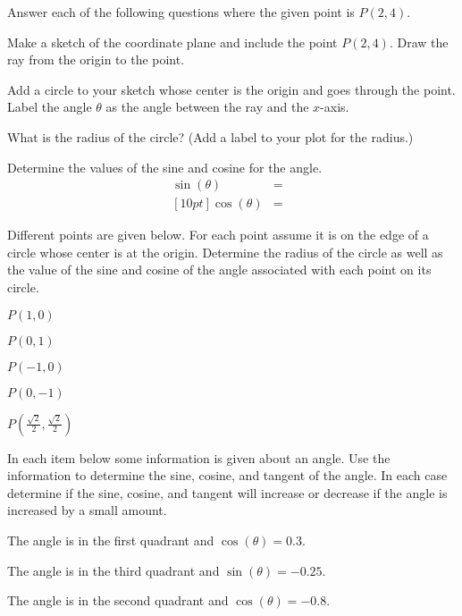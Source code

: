 \begin{problem}
\item Answer each of the following questions where the given point is $P(2,4)$.
  \begin{subproblem}
  \item Make a sketch of the coordinate plane and include the point
    $P(2,4)$. Draw the ray from the origin to the point.
    \vfill
  \item Add a circle to your sketch whose center is the origin and goes
    through the point. Label the angle $\theta$ as the angle between
    the ray and the $x$-axis.
  \item What is the radius of the circle? (Add a label to your plot for the radius.)
    \vspace{2em}
  \item Determine the values of the sine and cosine for the angle.
    \begin{eqnarray*}
      \sin(\theta) & = & \\ [10pt]
      \cos(\theta) & = &
    \end{eqnarray*}
  \end{subproblem}

\clearpage

\item Different points are given below. For each point assume it is
  on the edge of a circle whose center is at the origin.
  Determine the radius of the circle as well as the value of the
  sine and cosine of the angle associated with each point on its circle.
  \begin{subproblem}
  \item $P(1,0)$
    \vfill
  \item $P(0,1)$
    \vfill
  \item $P(-1,0)$
    \vfill
  \item $P(0,-1)$
    \vfill
  \item $P\left(\frac{\sqrt{2}}{2},\frac{\sqrt{2}}{2}\right)$
    \vfill
  \end{subproblem}

\clearpage

\item In each item below some information is given about an angle.
  Use the information to determine the sine, cosine, and tangent of the
  angle. In each case determine if the sine, cosine, and tangent will
  increase or decrease if the angle is increased by a small amount.
  \begin{subproblem}
    \item The angle is in the first quadrant and $\cos(\theta)=0.3$.
      \vfill
    \item The angle is in the third quadrant and $\sin(\theta)=-0.25$.
      \vfill
    \item The angle is in the second quadrant and $\cos(\theta)=-0.8$.
      \vfill
  \end{subproblem}


\end{problem}
